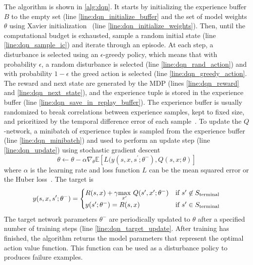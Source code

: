 The algorithm is shown in \cref{alg:dqn}. It starts by initializing the experience buffer $B$ to the empty set (line \ref{line:dqn_initialize_buffer} and the set of model weights $\theta$ using Xavier initialization~\cite{glorot2010understanding} (line \ref{line:dqn_initialize_weights}). Then, until the computational budget is exhausted, sample a random initial state (line \ref{line:dqn_sample_ic}) and iterate through an episode. At each step, a disturbance is selected using an $\epsilon$-greedy policy, which means that with probability $\epsilon$, a random disturbance is selected (line \ref{line:dqn_rand_action}) and with probability $1-\epsilon$ the greed action is selected (line \ref{line:dqn_greedy_action}. The reward and next state are generated by the MDP (lines \ref{line:dqn_reward} and \ref{line:dqn_next_state}), and the experience tuple is stored in the experience buffer (line \ref{line:dqn_save_in_replay_buffer}). The experience buffer is usually randomized to break correlations between experience samples, kept to fixed size, and prioritized by the temporal difference error of each sample~\cite{schaul2016prioritized}. To update the $Q$-network, a minibatch of experience tuples is sampled from the experience buffer (line \ref{line:dqn_minibatch}) and used to perform an update step (line \ref{line:dqn_update}) using stochastic gradient descent
\begin{equation}
    \theta \gets \theta - \alpha \nabla_{\theta} \mathbb{E}[L(y(s, x, s^\prime; \theta^-), Q(s,x; \theta)]
\end{equation}
where $\alpha$ is the learning rate and loss function $L$ can be the mean squared error or the Huber loss~\cite{huber1992robust}. The target is 
\begin{equation}
    y(s, x, s^\prime; \theta^-) = \begin{cases}
    R(s,x) + \gamma \underset{x^\prime}{\max} \  Q(s^\prime, x^\prime;  \theta^-) & \text{if } s^\prime \not \in S_{\rm terminal} \\ 
    y(s^\prime; \theta^-) = R(s,x) & \text{if } s^\prime \in S_{\rm terminal} \\ 
    \end{cases}
\end{equation}
The target network parameters $\theta^-$ are periodically updated to $\theta$ after a specified number of training steps (line \ref{line:dqn_target_update}. After training has finished, the algorithm returns the model parameters that represent the optimal action value function. This function can be used as a disturbance policy to produces failure examples.

